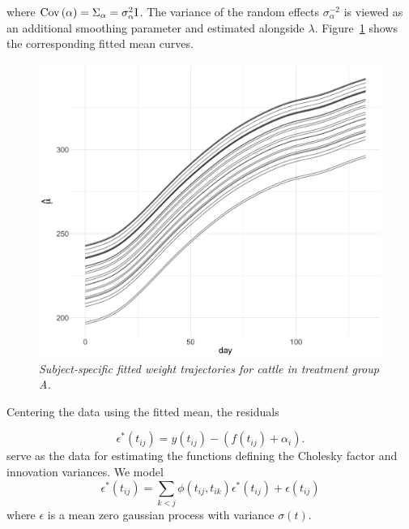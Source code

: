 \noindent
where $\textup{Cov}\left(\alpha\right) = \Sigma_\alpha = \sigma_\alpha^2 \mathrm{I}$. The variance of the random effects $\sigma^{-2}_\alpha$  is viewed as an additional smoothing parameter and estimated alongside $\lambda$. Figure~\ref{fig:cattleA-smoothed-weights-vs-time} shows the corresponding fitted mean curves. 

%

\begin{figure}[H] 
\begin{center}
\includegraphics[width = .7\textwidth]{img/cattle/cattleA-weights-vs-time-mean-fit}
\caption{\textit{Subject-specific fitted weight trajectories for cattle in treatment group A. }}
\label{fig:cattleA-smoothed-weights-vs-time}
\end{center}
\end{figure} 

Centering the data using the fitted mean, the residuals 

\begin{equation} \label{eq:cattleA-dynamic-cond-mixed-model-2}
\epsilon^*\left(t_{ij}\right) = y\left(t_{ij}\right) - \left(f\left(t_{ij} \right) + \alpha_{i}\right).
\end{equation}
\noindent
serve as the data for estimating the functions defining the Cholesky factor and innovation variances. We model
\begin{equation} \label{eq:cattleA-dynamic-cond-mixed-model-1}
\epsilon^*\left(t_{ij}\right) = \sum_{k < j} \phi\left( t_{ij}, t_{ik} \right) \epsilon^*\left(t_{ij}\right) + \epsilon\left(t_{ij}\right)
\end{equation}
\noindent
where $\epsilon$ is a mean zero gaussian process with variance $\sigma\left(t\right)$.

